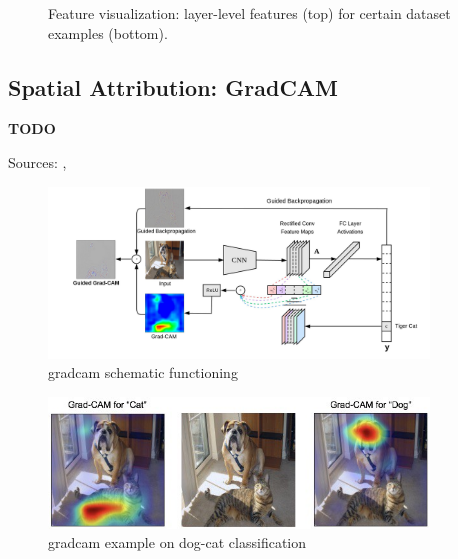 \begin{figure}[!htb]
\begin{center}
\begin{subfigure}[h]{0.23\textwidth}
		\end{subfigure}
	\end{center}
	\vspace{-0.5cm}
	\caption[Feature visualization: layer-level features for certain dataset example]{Feature visualization: layer-level features (top) for certain dataset examples (bottom).}
	\label{fig:feature-visual-1}
\end{figure}



\subsection{Spatial Attribution: GradCAM}
\label{subsec:gradcam-theory}

\textbf{TODO}

Sources: \cite{Selvaraju_2019}, \cite{gradcam_medium}

\begin{figure}[!htb]
	\centering
	\includegraphics[width=0.9\textwidth]{"contents/images/gradcam/02-gradcam-schema"}
	\caption[\gls{gradcam} schematic functioning]{\gls{gradcam} schematic functioning \cite{Selvaraju_2019}}
	\label{fig:gradcam-schema}
\end{figure}

\begin{figure}[!htb]
\centering
\includegraphics[width=0.9\textwidth]{"contents/images/gradcam/02-gradcam-catdog"}
\caption[\gls{gradcam} example on dog-cat classification]{\gls{gradcam} example on dog-cat classification \cite{Selvaraju_2019}}
\label{fig:gradcam-catdog}
\end{figure}




